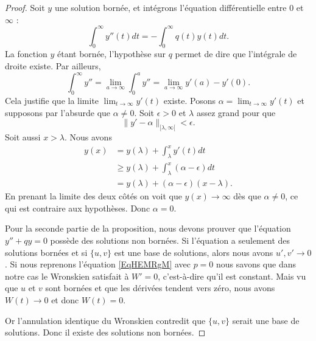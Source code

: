 \begin{proof}
    Soit \( y\) une solution bornée, et intégrons l'équation différentielle entre \( 0\) et \( \infty\) :
    \begin{equation}
        \int_0^{\infty}y''(t)dt=-\int_0^{\infty}q(t)y(t)dt.
    \end{equation}
    La fonction \( y\) étant bornée, l'hypothèse sur \( q\) permet de dire que l'intégrale de droite existe. Par ailleurs,
    \begin{equation}
        \int_0^{\infty}y''=\lim_{a\to \infty}\int_0^ay''=\lim_{a\to \infty}y'(a)-y'(0).
    \end{equation}
    Cela justifie que la limite \( \lim_{t\to \infty} y'(t)\) existe. Posons \( \alpha=\lim_{t\to \infty} y'(t)\) et supposons par l'absurde que \( \alpha\neq 0\). Soit \( \epsilon>0\) et \( \lambda\) assez grand pour que
    \begin{equation}
        \| y'-\alpha \|_{\mathopen[ \lambda , \infty [}<\epsilon.
    \end{equation}
    Soit aussi \( x>\lambda\). Nous avons
    \begin{subequations}
        \begin{align}
            y(x)&=y(\lambda) + \int_{\lambda}^x y'(t)dt\\
            &\geq y(\lambda) + \int_{\lambda}^x (\alpha-\epsilon) dt\\
            &=y(\lambda) + (\alpha-\epsilon)(x - \lambda).
        \end{align}
    \end{subequations}
    En prenant la limite des deux côtés on voit que \( y(x)\to \infty\) dès que \( \alpha\neq 0\), ce qui est contraire aux hypothèses. Donc \( \alpha=0\).

    Pour la seconde partie de la proposition, nous devons prouver que l'équation \( y''+qy=0\) possède des solutions non bornées. Si l'équation a seulement des solutions bornées et si \( \{ u,v \}\) est une base de solutions, alors nous avons \( u',v'\to 0\). Si nous reprenons l'équation \eqref{EqHEMRgM} avec \( p=0\) nous savons que dans notre cas le Wronskien satisfait à \( W'=0\), c'est-à-dire qu'il est constant. Mais vu que \( u\) et \( v\) sont bornées et que les dérivées tendent vers zéro, nous avons \( W(t)\to 0\) et donc \( W(t)=0\).

    Or l'annulation identique du Wronskien contredit que \( \{ u,v \}\) serait une base de solutions. Donc il existe des solutions non bornées.
\end{proof}

